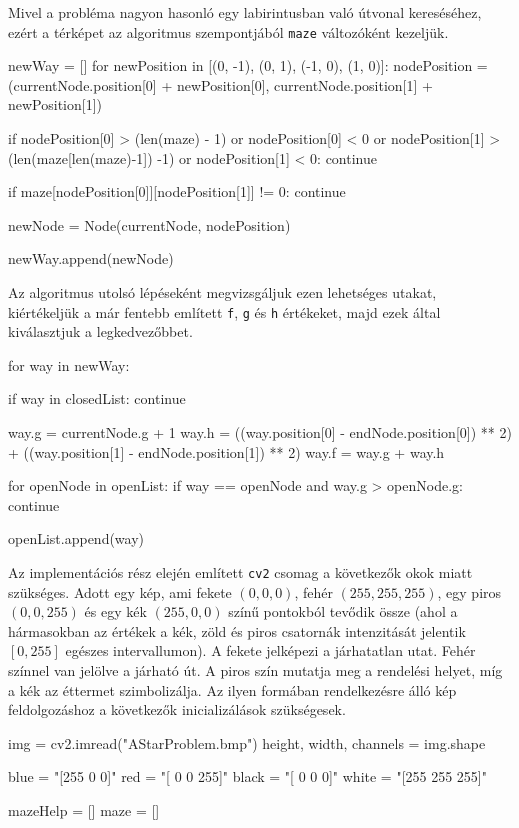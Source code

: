 Mivel a probléma nagyon hasonló egy labirintusban való útvonal kereséséhez, ezért a térképet az algoritmus szempontjából \texttt{maze} változóként kezeljük.
\begin{python}
newWay = []                
for newPosition in [(0, -1), (0, 1), (-1, 0), (1, 0)]:
    nodePosition = (currentNode.position[0] + newPosition[0], 
            		currentNode.position[1] + newPosition[1])

    if nodePosition[0] > (len(maze) - 1) or 
    nodePosition[0] < 0 or 
    nodePosition[1] > (len(maze[len(maze)-1]) -1) or 
    nodePosition[1] < 0:
        continue

    if maze[nodePosition[0]][nodePosition[1]] != 0:
        continue

    newNode = Node(currentNode, nodePosition)
    
    newWay.append(newNode)
\end{python}

Az algoritmus utolsó lépéseként megvizsgáljuk ezen lehetséges utakat, kiértékeljük a már fentebb említett \texttt{f}, \texttt{g} és \texttt{h} értékeket, majd ezek által kiválasztjuk a legkedvezőbbet.
\begin{python}
for way in newWay:

    if way in closedList:
        continue

    way.g = currentNode.g + 1
    way.h = ((way.position[0] - endNode.position[0]) ** 2) + 
    		((way.position[1] - endNode.position[1]) ** 2)
    way.f = way.g + way.h

    for openNode in openList:
        if way == openNode and way.g > openNode.g:
            continue

    openList.append(way)
\end{python}

Az implementációs rész elején említett \texttt{cv2} csomag a következők okok miatt szükséges.
Adott egy kép, ami fekete $(0, 0, 0)$, fehér $(255, 255, 255)$, egy piros $(0 ,0, 255)$ és egy kék $(255,0,0)$ színű pontokból tevődik össze (ahol a hármasokban az értékek a kék, zöld és piros csatornák intenzitását jelentik $[0, 255]$ egészes intervallumon). A fekete jelképezi a járhatatlan utat. Fehér színnel van jelölve a járható út. A piros szín mutatja meg a rendelési helyet, míg a kék az éttermet szimbolizálja. Az ilyen formában rendelkezésre álló kép feldolgozáshoz a következők inicializálások szükségesek.

\begin{python}
img = cv2.imread("AStarProblem.bmp")
height, width, channels = img.shape

blue =  "[255   0   0]"
red =   "[  0   0 255]"
black = "[  0   0   0]"
white = "[255 255 255]"

mazeHelp = []
maze = []
\end{python}

